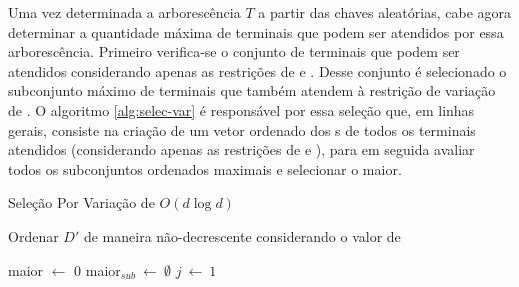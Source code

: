 Uma vez  determinada a arborescência  $T$ a  partir das chaves  aleatórias, cabe
agora determinar  a quantidade máxima de  terminais que podem ser  atendidos por
essa arborescência. Primeiro  verifica-se o conjunto de terminais  que podem ser
atendidos  considerando apenas  as  restrições de  {\delay}  e {\jitter}.  Desse
conjunto é  selecionado o subconjunto máximo  de terminais que também  atendem à
restrição de variação de {\delay}. O algoritmo \ref{alg:selec-var} é responsável
por essa seleção que, em linhas gerais, consiste na criação de um vetor ordenado
dos  {\delay  s}  de  todos  os  terminais  atendidos  (considerando  apenas  as
restrições  de  {\delay}  e  {\jitter}),   para  em  seguida  avaliar  todos  os
subconjuntos ordenados maximais e selecionar o maior.



\begin{algorithm}[!ht]
  \caption{Seleção Por Variação de {\delay} $O(d \log d)$ \label{alg:selec-var}}
  
  Ordenar $D'$ de maneira não-decrescente considerando o valor de \delay \;

  maior $\leftarrow$ 0\;
  maior$_{sub} \ \leftarrow \ \emptyset$\;  
  $j \ \leftarrow \ 1$\;
  \;
\end{algorithm}
\newpage


